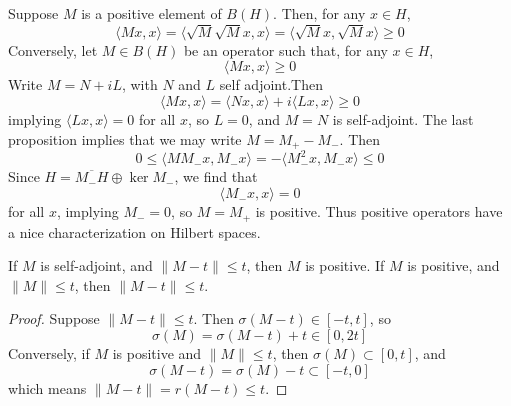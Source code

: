 \begin{example}
    Suppose $M$ is a positive element of $B(H)$. Then, for any $x \in H$,
    \[ \langle Mx,x \rangle = \langle \sqrt{M}\sqrt{M}x,x \rangle = \langle \sqrt{M}x, \sqrt{M}x \rangle \geq 0 \]
    Conversely, let $M \in B(H)$ be an operator such that, for any $x \in H$,
    \[ \langle Mx, x \rangle \geq 0 \]
    Write $M = N + iL$, with $N$ and $L$ self adjoint.Then
    \[ \langle Mx, x \rangle = \langle Nx, x \rangle + i \langle Lx, x \rangle \geq 0 \]
    implying $\langle Lx, x \rangle = 0$ for all $x$, so $L = 0$, and $M = N$ is self-adjoint. The last proposition implies that we may write $M = M_+ - M_-$. Then
    \[ 0 \leq \langle MM_-x, M_-x \rangle = - \langle M_-^2 x, M_- x \rangle \leq 0 \]
    Since $H = \overline{M_-H} \oplus \ker M_-$, we find that
    \[ \langle M_-x, x \rangle = 0 \]
    for all $x$, implying $M_- = 0$, so $M = M_+$ is positive. Thus positive operators have a nice characterization on Hilbert spaces.
\end{example}

\begin{lemma}
    If $M$ is self-adjoint, and $\| M - t \| \leq t$, then $M$ is positive. If $M$ is positive, and $\| M \| \leq t$, then $\| M - t \| \leq t$.
\end{lemma}
\begin{proof}
    Suppose $\| M - t \| \leq t$. Then $\sigma(M - t) \in [-t,t]$, so
    \[ \sigma(M) = \sigma(M - t) + t \in [0, 2t] \]
    Conversely, if $M$ is positive and $\| M \| \leq t$, then $\sigma(M) \subset [0,t]$, and
    \[ \sigma(M - t) = \sigma(M) - t \subset [-t,0] \]
    which means $\| M - t \| = r(M - t) \leq t$.
\end{proof}

